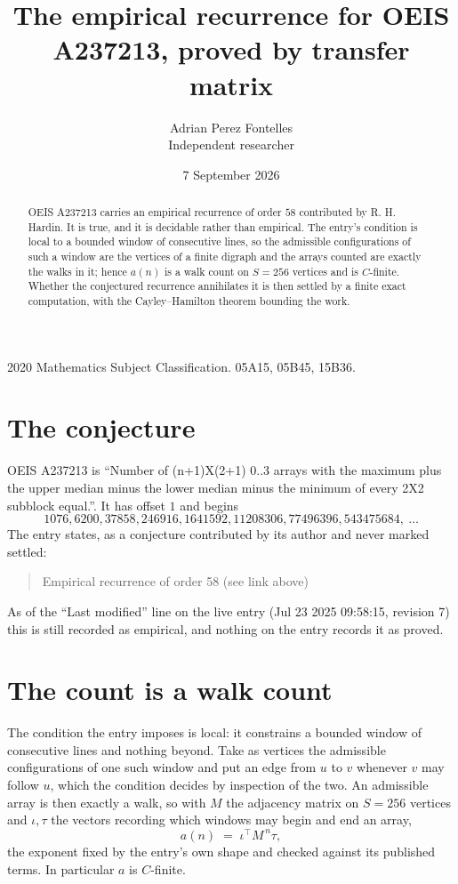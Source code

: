 \documentclass[11pt,a4paper]{article}
\title{The empirical recurrence for OEIS A237213, proved by transfer matrix}
\author{Adrian Perez Fontelles\\ \small Independent researcher}
\date{7 September 2026}
\theoremstyle{plain}
\theoremstyle{definition}
\begin{document}
\maketitle

\begin{abstract}
OEIS A237213 carries an empirical recurrence of order $58$ contributed by R. H. Hardin. It is
true, and it is decidable rather than empirical. The entry's condition is local to a bounded window of consecutive lines, so
the admissible configurations of such a window are the vertices of a finite digraph and the
arrays counted are exactly the walks in it; hence $a(n)$ is a walk count on $S=256$ vertices
and is $C$-finite. Whether the conjectured recurrence annihilates it is then settled by a
finite exact computation, with the Cayley--Hamilton theorem bounding the work.
\end{abstract}

\noindent\small 2020 Mathematics Subject Classification. 05A15, 05B45, 15B36.\normalsize

\section{The conjecture}

OEIS A237213 is ``Number of (n+1)X(2+1) 0..3 arrays with the maximum plus the upper median minus the lower median minus the minimum of every 2X2 subblock equal.''. It has offset $1$ and begins
\[
1076, 6200, 37858, 246916, 1641592, 11208306, 77496396, 543475684,\ \dots
\]
The entry states, as a conjecture contributed by its author and never marked settled:
\begin{quote}
Empirical recurrence of order 58 (see link above)
\end{quote}
As of the ``Last modified'' line on the live entry (Jul 23 2025 09:58:15, revision 7) this is still
recorded as empirical, and nothing on the entry records it as proved.

\section{The count is a walk count}

The condition the entry imposes is local: it constrains a bounded window of consecutive lines and nothing beyond. Take as
vertices the admissible configurations of one such window and put an edge from $u$ to $v$
whenever $v$ may follow $u$, which the condition decides by inspection of the two. An
admissible array is then exactly a walk, so with $M$ the adjacency matrix on $S=256$ vertices
and $\iota,\tau$ the vectors recording which windows may begin and end an array,
\[
a(n)\;=\;\iota^{\!\top}M^{\,n}\tau ,
\]
the exponent fixed by the entry's own shape and checked against its published terms. In
particular $a$ is $C$-finite.
\end{document}
